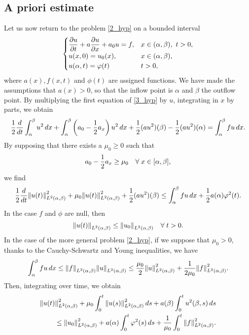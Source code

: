 \subsection{A priori estimate}
Let us now return to the problem \eqref{2_hyp} on a bounded interval
\begin{equation}
    \begin{cases}
        \displaystyle \partialderivative{u}{t} + a \partialderivative{u}{x} + a_0 u =  f, & x \in (\alpha, \beta), \ t > 0, \\
        u(x,0) = u_0(x), & x \in (\alpha,\beta), \\
        u(\alpha, t) = \phi(t) & t > 0,
    \end{cases}
    \label{3_hyp}
\end{equation}
where \(a(x), f(x,t)\) and \(\phi(t)\) are assigned functions. We have made the assumptions that \(a(x) > 0\), so that the inflow point is \(\alpha\) and \(\beta\) the outflow point. By multiplying the first equation of \eqref{3_hyp} by \(u\), integrating in \(x\) by parts, we obtain 
\begin{equation*}
    \frac{1}{2}\frac{d}{dt} \int_\alpha^\beta u^2 \, dx + \int_\alpha^\beta \left( a_0 - \frac{1}{2} a_x \right) u^2 \, dx + \frac{1}{2} (au^2)(\beta) -\frac{1}{2} (au^2)(\alpha) = \int_\alpha^\beta fu \, dx.
\end{equation*}
By supposing that there exists a \(\mu_0 \geq 0\) such that
\[
    a_0 -\frac{1}{2} a_x \geq \mu_0 \quad \forall \; x \in [\alpha, \beta],
\]
we find 
\[
    \frac{1}{2} \frac{d}{dt} \norm{u(t)}^2_{L^2(\alpha,\beta)} + \mu_0 \norm{u(t)}^2_{L^2(\alpha,\beta)} + \frac{1}{2} (au^2)(\beta) \leq \int_\alpha^\beta fu \, dx + \frac{1}{2} a(\alpha)\varphi^2(t).
\]
In the case \(f\) and \(\phi\) are null, then
\[
    \norm{u(t)}_{L^2(\alpha,\beta)} \leq \norm{u_0}_{L^2(\alpha,\beta)} \quad \forall \; t > 0.
\]
In the case of the more general problem \eqref{2_hyp}, if we suppose that \(\mu_0 > 0\), thanks to the Cauchy-Schwartz and Young inequalities, we have
\[
    \int_\alpha^\beta fu \, dx \leq \norm{f}_{L^2(\alpha,\beta)}\norm{u}_{L^2(\alpha,\beta)} \leq \frac{\mu_0}{2} \norm{u}_{L^2(\alpha,\beta)}^2 + \frac{1}{2\mu_0} \norm{f}_{L^2(\alpha,\beta)}^2.
\]
Then, integrating over time, we obtain 
\begin{equation*}
    \begin{split}
        \norm{u(t)}_{L^2(\alpha,\beta)}^2 + \mu_0 \int_0^t \norm{u(s)}_{L^2(\alpha,\beta)}^2 \, ds + a(\beta)\int_0^t u^2(\beta,s) \, ds \\
        \leq \norm{u_0}^2_{L^2(\alpha,\beta)} + a(\alpha)\int^t_0 \varphi^2(s) \, ds + \frac{1}{\mu_0} \int_0^t \norm{f}^2_{L^2(\alpha,\beta)}.
    \end{split}
\end{equation*}
